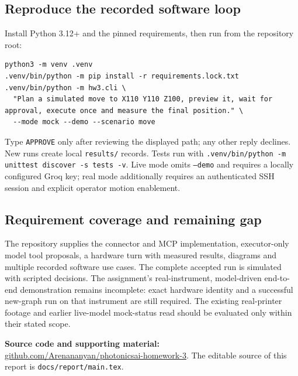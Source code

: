 \documentclass[11pt,a4paper]{article}
\newcommand{\code}[1]{\texttt{\small #1}}
\newcommand{\repo}{https://github.com/Arenananyan/photonicsai-homework-3}
\begin{document}
\subsection{Reproduce the recorded software loop}
Install Python 3.12+ and the pinned requirements, then run from the repository root:
\begin{lstlisting}
python3 -m venv .venv
.venv/bin/python -m pip install -r requirements.lock.txt
.venv/bin/python -m hw3.cli \
  "Plan a simulated move to X110 Y110 Z100, preview it, wait for approval, execute once and measure the final position." \
  --mode mock --demo --scenario move
\end{lstlisting}
Type \code{APPROVE} only after reviewing the displayed path; any other reply
declines. New runs create local \code{results/} records. Tests run with
\code{.venv/bin/python -m unittest discover -s tests -v}. Live mode omits
\code{--demo} and requires a locally configured Groq key; real mode additionally
requires an authenticated SSH session and explicit operator motion enablement.

\subsection{Requirement coverage and remaining gap}
The repository supplies the connector and MCP implementation, executor-only model
tool proposals, a hardware turn with measured results, diagrams and multiple
recorded software use cases. The complete accepted run is simulated with scripted
decisions. The assignment's real-instrument, model-driven end-to-end demonstration
remains incomplete: exact hardware identity and a successful new-graph run on that
instrument are still required. The existing real-printer footage and earlier
live-model mock-status read should be evaluated only within their stated scope.

\textbf{Source code and supporting material:}
\href{\repo}{github.com/Arenananyan/photonicsai-homework-3}.
The editable source of this report is \code{docs/report/main.tex}.
\end{document}

